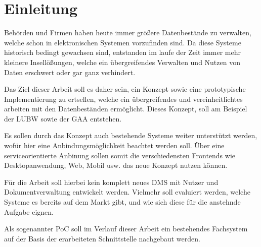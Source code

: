 \section{Einleitung} \label{Einfuehrung}
Beh\"orden und Firmen haben heute immer gr\"o\ss{}ere Datenbest\"ande zu verwalten, welche schon in elektronischen Systemen vorzufinden sind. Da diese Systeme historisch bedingt gewachsen sind, entstanden im laufe der Zeit immer mehr kleinere Insell\"o\ss{}ungen, welche ein \"ubergreifendes Verwalten und Nutzen von Daten erschwert oder gar ganz verhindert.

Das Ziel dieser Arbeit soll es daher sein, ein Konzept sowie eine prototypische Implementierung zu ertsellen, welche ein \"ubergreifendes und vereinheitlichtes arbeiten mit den Datenbest\"anden erm\"oglicht. Dieses Konzept, soll am Beispiel der \ac{LUBW} sowie der \ac{GAA} entstehen.

Es sollen durch das Konzept auch bestehende Systeme weiter unterst\"utzt werden, wof\"ur hier eine Anbindungsm\"oglichkeit beachtet werden soll. \"Uber eine serviceorientierte Anbinung sollen somit die verschiedensten Frontends wie Desktopanwendung, Web, Mobil usw. das neue Konzept nutzen k\"onnen.

F\"ur die Arbeit soll hierbei kein komplett neues \ac{DMS} mit Nutzer und Dokumentverwaltung entwickelt werden. Vielmehr soll evaluiert werden, welche Systeme es bereits auf dem Markt gibt, und wie sich diese f\"ur die anstehnde Aufgabe eignen. 

Als sogenannter \ac{PoC} soll im Verlauf dieser Arbeit ein bestehendes Fachsystem auf der Basis der erarbeiteten Schnittstelle nachgebaut werden.